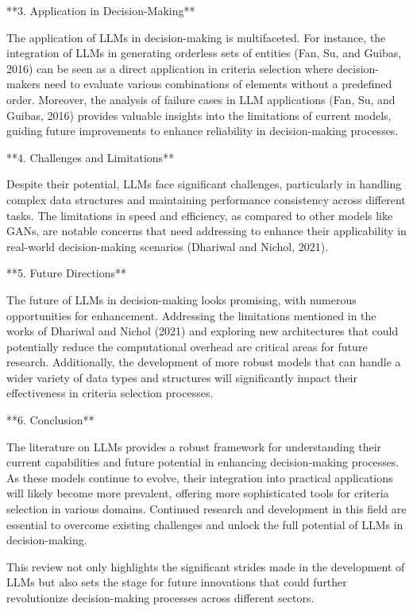 \documentclass[conference]{IEEEtran}
\begin{document}
**3. Application in Decision-Making**

The application of LLMs in decision-making is multifaceted. For instance, the integration of LLMs in generating orderless sets of entities (Fan, Su, and Guibas, 2016) can be seen as a direct application in criteria selection where decision-makers need to evaluate various combinations of elements without a predefined order. Moreover, the analysis of failure cases in LLM applications (Fan, Su, and Guibas, 2016) provides valuable insights into the limitations of current models, guiding future improvements to enhance reliability in decision-making processes.

**4. Challenges and Limitations**

Despite their potential, LLMs face significant challenges, particularly in handling complex data structures and maintaining performance consistency across different tasks. The limitations in speed and efficiency, as compared to other models like GANs, are notable concerns that need addressing to enhance their applicability in real-world decision-making scenarios (Dhariwal and Nichol, 2021).

**5. Future Directions**

The future of LLMs in decision-making looks promising, with numerous opportunities for enhancement. Addressing the limitations mentioned in the works of Dhariwal and Nichol (2021) and exploring new architectures that could potentially reduce the computational overhead are critical areas for future research. Additionally, the development of more robust models that can handle a wider variety of data types and structures will significantly impact their effectiveness in criteria selection processes.

**6. Conclusion**

The literature on LLMs provides a robust framework for understanding their current capabilities and future potential in enhancing decision-making processes. As these models continue to evolve, their integration into practical applications will likely become more prevalent, offering more sophisticated tools for criteria selection in various domains. Continued research and development in this field are essential to overcome existing challenges and unlock the full potential of LLMs in decision-making.

This review not only highlights the significant strides made in the development of LLMs but also sets the stage for future innovations that could further revolutionize decision-making processes across different sectors.
\end{document}
